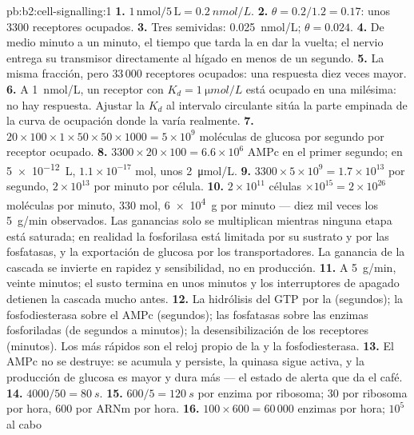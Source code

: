 \begin{solution}{pb:b2:cell-signalling:1}
\textbf{1.} $1\,\text{nmol}/5\,\text{L} = \qty{0.2}{nmol/L}$.
\textbf{2.} $\theta = 0.2/1.2 = 0.17$: unos 3300 receptores ocupados.
\textbf{3.} Tres semividas: \qty{0.025}{nmol/L}; $\theta = 0.024$.
\textbf{4.} De medio minuto a un minuto, el tiempo que tarda la  en
dar la vuelta; el nervio entrega su transmisor directamente al hígado en
menos de un segundo.
\textbf{5.} La misma fracción, pero $33\,000$ receptores ocupados: una
respuesta diez veces mayor.
\textbf{6.} A \qty{1}{nmol/L}, un receptor con $K_d = \qty{1}{\micro
mol/L}$ está ocupado en una milésima: no hay respuesta. Ajustar la $K_d$ al
intervalo circulante sitúa la parte empinada de la curva de ocupación
donde la  varía realmente.
\textbf{7.} $20\times 100\times 1\times 50\times 50\times 1000 =
5\times 10^{9}$ moléculas de glucosa por segundo por receptor ocupado.
\textbf{8.} $3300\times 20\times 100 = 6.6\times 10^{6}$ AMPc en el
primer segundo; en \qty{5e-12}{L}, $1.1\times 10^{-17}$ mol, unos
\qty{2}{\micro mol/L}.
\textbf{9.} $3300\times 5\times 10^{9} = 1.7\times 10^{13}$ por segundo, $2\times
10^{13}$ por minuto por célula.
\textbf{10.} $2\times 10^{11}$ células $\times 10^{15} = 2\times
10^{26}$ moléculas por minuto, 330 mol, \qty{6e4}{g} por minuto ---
diez mil veces los \qty{5}{g/min} observados. Las ganancias solo se
multiplican mientras ninguna etapa está saturada; en realidad la
fosforilasa está limitada por su sustrato y por las fosfatasas, y la
exportación de glucosa por los transportadores. La ganancia de la cascada
se invierte en rapidez y sensibilidad, no en producción.
\textbf{11.} A \qty{5}{g/min}, veinte minutos; el susto termina en unos
minutos y los interruptores de apagado detienen la cascada mucho antes.
\textbf{12.} La hidrólisis del GTP por la  (segundos); la
fosfodiesterasa sobre el AMPc (segundos); las fosfatasas sobre las
enzimas fosforiladas (de segundos a minutos); la desensibilización de los
receptores (minutos). Los más rápidos son el reloj propio de la  y la fosfodiesterasa.
\textbf{13.} El AMPc no se destruye: se acumula y persiste, la quinasa
sigue activa, y la producción de glucosa es mayor y dura más --- el
estado de alerta que da el café.
\textbf{14.} $4000/50 = \qty{80}{s}$.
\textbf{15.} $600/5 = \qty{120}{s}$ por enzima por ribosoma; 30 por
ribosoma por hora, 600 por ARNm por hora.
\textbf{16.} $100\times 600 = 60\,000$ enzimas por hora; $10^{5}$ al cabo

\end{solution}
